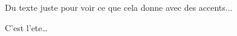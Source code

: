 \documentclass[frenchb,pdftex]{scrartcl}
\begin{document}

Du texte juste pour voir ce que cela donne avec des accents...


C'est l'\gls{ete}\dots

\printglossary
\end{document}
